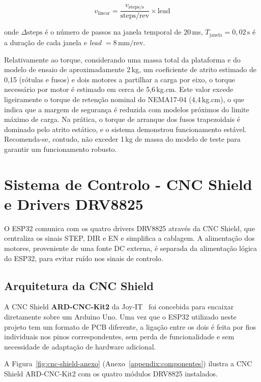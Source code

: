 \begin{equation}
v_{\text{linear}} = \frac{v_{\text{steps/s}}}{\text{steps/rev}} \times \text{lead}
\label{eq:velocidade-linear}
\end{equation}

onde $\Delta\text{steps}$ é o número de passos na janela temporal de 20\,ms, $T_{\text{janela}} = 0{,}02\,\text{s}$ é a duração de cada janela e \textit{lead} $= 8\,\text{mm/rev}$.

Relativamente ao torque, considerando uma massa total da plataforma e do modelo de ensaio de aproximadamente 2\,kg, um coeficiente de atrito estimado de 0,15 (rótulas e fusos) e dois motores a partilhar a carga por eixo, o torque necessário por motor é estimado em cerca de 5,6\,kg.cm. Este valor excede ligeiramente o torque de retenção nominal do NEMA17-04 (4,4\,kg.cm), o que indica que a margem de segurança é reduzida com modelos próximos do limite máximo de carga. Na prática, o torque de arranque dos fusos trapezoidais é dominado pelo atrito estático, e o sistema demonstrou funcionamento estável. Recomenda-se, contudo, não exceder 1\,kg de massa do modelo de teste para garantir um funcionamento robusto.


\section{Sistema de Controlo - CNC Shield e Drivers DRV8825}
\label{sec:sistema-controlo}

O ESP32 comunica com os quatro drivers DRV8825 através da CNC Shield, que centraliza os sinais STEP, DIR e EN e simplifica a cablagem. A alimentação dos motores, proveniente de uma fonte DC externa, é separada da alimentação lógica do ESP32, para evitar ruído nos sinais de controlo.


\subsection{Arquitetura da CNC Shield}
\label{subsec:arquitetura-cnc}

A CNC Shield \textbf{ARD-CNC-Kit2} da Joy-IT~\cite{JoyITCNCKit2} foi concebida para encaixar diretamente sobre um Arduino Uno. Uma vez que o ESP32 utilizado neste projeto tem um formato de PCB diferente, a ligação entre os dois é feita por fios individuais nos pinos correspondentes, sem perda de funcionalidade e sem necessidade de adaptação de hardware adicional.

A Figura~\ref{fig:cnc-shield-anexo} (Anexo~\ref{appendix:componentes}) ilustra a CNC Shield ARD-CNC-Kit2 com os quatro módulos DRV8825 instalados.

